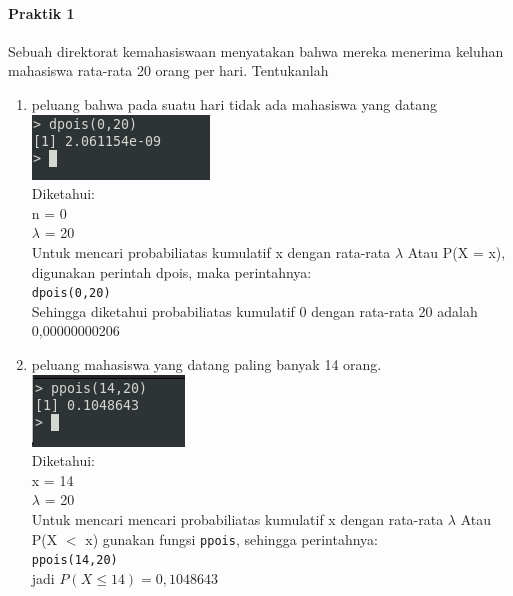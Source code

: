 \documentclass[a4paper,12pt]{article}
\begin{document}
\begin{enumerate}[label=\textbf{\Alph*.}]
\paragraph{Praktik 1\\}
Sebuah direktorat kemahasiswaan menyatakan bahwa mereka menerima keluhan
mahasiswa rata-rata 20 orang per hari. Tentukanlah
\begin{enumerate}[label=\alph*.]
	\item peluang bahwa pada suatu hari tidak ada mahasiswa yang datang\\
	\includegraphics[scale=1]{prakd1a}\\
	Diketahui:\\
	n = 0 \\
	$\lambda$ = 20 \\
	Untuk mencari probabiliatas kumulatif x dengan rata-rata $\lambda$
	Atau P(X = x), digunakan perintah dpois, maka perintahnya:\\
	\texttt{dpois(0,20)}\\
	Sehingga diketahui probabiliatas kumulatif 0 dengan rata-rata 20 adalah 0,00000000206
	
	\item peluang mahasiswa yang datang paling banyak 14 orang.\\
	\includegraphics{prakd1b}\\
	Diketahui:\\
	x = 14\\
	$\lambda$ = 20\\
	Untuk mencari mencari probabiliatas kumulatif x dengan rata-rata $\lambda$
	Atau P(X $<$ x) gunakan fungsi \texttt{ppois}, sehingga perintahnya:\\
	\texttt{ppois(14,20)\\}
	jadi $P(X \leq 14) = 0,1048643$
\end{enumerate}

\newpage

\end{enumerate}
\end{document}
